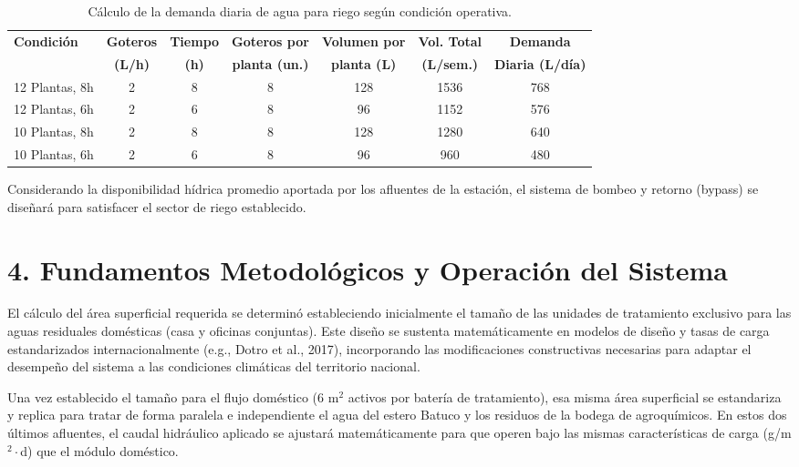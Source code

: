 \documentclass[12pt]{article}
\begin{document}
\begin{table}[H]
    \centering
    \caption{Cálculo de la demanda diaria de agua para riego según condición operativa.}
    \vspace{0.5em}
    \begin{tabular}{lcccccc}
        \toprule
        \textbf{Condición} & \textbf{Goteros} & \textbf{Tiempo} & \textbf{Goteros por} & \textbf{Volumen por} & \textbf{Vol. Total} & \textbf{Demanda} \\
        & \textbf{(L/h)} & \textbf{(h)} & \textbf{planta (un.)} & \textbf{planta (L)} & \textbf{(L/sem.)} & \textbf{Diaria (L/día)} \\
        \midrule
        12 Plantas, 8h & 2 & 8 & 8 & 128 & 1536 & 768 \\
        12 Plantas, 6h & 2 & 6 & 8 & 96 & 1152 & 576 \\
        10 Plantas, 8h & 2 & 8 & 8 & 128 & 1280 & 640 \\
        10 Plantas, 6h & 2 & 6 & 8 & 96 & 960 & 480 \\
        \bottomrule
    \end{tabular}
\end{table}

Considerando la disponibilidad hídrica promedio aportada por los afluentes de la estación, el sistema de bombeo y retorno (bypass) se diseñará para satisfacer el sector de riego establecido.

\section*{4. Fundamentos Metodológicos y Operación del Sistema}

El cálculo del área superficial requerida se determinó estableciendo inicialmente el tamaño de las unidades de tratamiento exclusivo para las aguas residuales domésticas (casa y oficinas conjuntas). Este diseño se sustenta matemáticamente en modelos de diseño y tasas de carga estandarizados internacionalmente (e.g., Dotro et al., 2017), incorporando las modificaciones constructivas necesarias para adaptar el desempeño del sistema a las condiciones climáticas del territorio nacional.

Una vez establecido el tamaño para el flujo doméstico (6 m$^2$ activos por batería de tratamiento), esa misma área superficial se estandariza y replica para tratar de forma paralela e independiente el agua del estero Batuco y los residuos de la bodega de agroquímicos. En estos dos últimos afluentes, el caudal hidráulico aplicado se ajustará matemáticamente para que operen bajo las mismas características de carga (g/m$^2\cdot$d) que el módulo doméstico.
\end{document}
